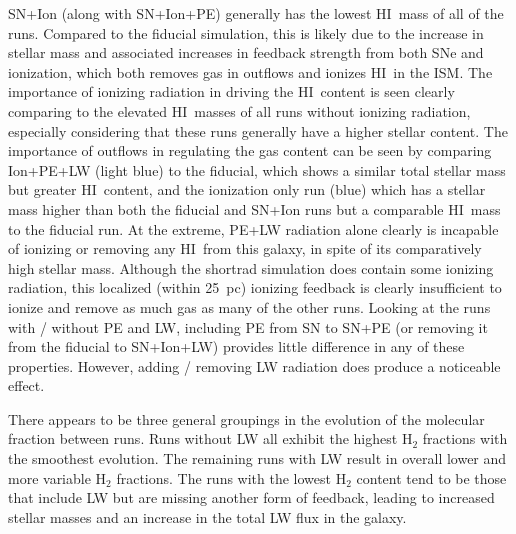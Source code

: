 \documentclass[twocolumn]{aastex62}
\newcommand{\radstyle}{light blue}
\newcommand{\ionstyle}{blue}
\newcommand{\pelwstyle}{dark blue}
\newcommand{\HI}{HI}
\begin{document}
SN+Ion (along with SN+Ion+PE) generally has the lowest \HI~mass of all of the runs. Compared to the fiducial simulation, this is likely due to the increase in stellar mass and associated increases in feedback strength from both SNe and ionization, which both removes gas in outflows and ionizes \HI~in the ISM. The importance of ionizing radiation in driving the \HI~content is seen clearly comparing to the elevated \HI~masses of all runs without ionizing radiation, especially considering that these runs generally have a higher stellar content. The importance of outflows in regulating the gas content can be seen by comparing Ion+PE+LW (\radstyle) to the fiducial, which shows a similar total stellar mass but greater \HI~content, and the ionization only run (\ionstyle) which has a stellar mass higher than both the fiducial and SN+Ion runs but a comparable \HI~mass to the fiducial run. At the extreme, PE+LW radiation alone clearly is incapable of ionizing or removing any \HI~from this galaxy, in spite of its comparatively high stellar mass. Although the shortrad simulation does contain some ionizing radiation, this localized (within 25~pc) ionizing feedback is clearly insufficient to ionize and remove as much gas as many of the other runs. Looking at the runs with / without PE and LW, including PE from SN to SN+PE (or removing it from the fiducial to SN+Ion+LW) provides little difference in any of these properties. However, adding / removing LW radiation does produce a noticeable effect. 

There appears to be three general groupings in the evolution of the molecular fraction between runs. Runs without LW all exhibit the highest H$_2$ fractions with the smoothest evolution. The remaining runs with LW result in overall lower and more variable H$_2$ fractions. The runs with the lowest H$_2$ content tend to be those that include LW but are missing another form of feedback, leading to increased stellar masses and an increase in the total LW flux in the galaxy. 

\end{document}
